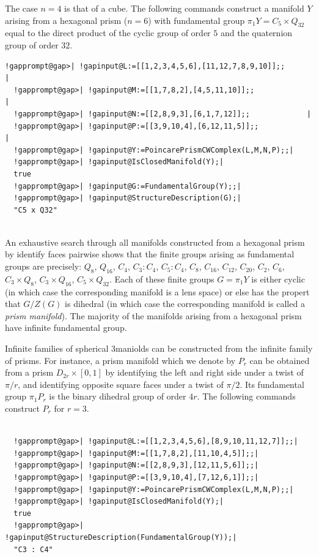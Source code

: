 \documentclass[a4paper,11pt]{report}
\begin{document}
{{  

The case $n=4$ is that of a cube. The following commands construct a manifold $Y$ arising from a hexagonal prism ($n=6$) with fundamental group $\pi_1Y=C_5\times Q_{32}$ equal to the direct product of the cyclic group of order $5$ and the quaternion group of order $32$. 
\begin{Verbatim}[commandchars=!@|,fontsize=\small,frame=single,label=Example]
  !gapprompt@gap>| !gapinput@L:=[[1,2,3,4,5,6],[11,12,7,8,9,10]];;                 |
  !gapprompt@gap>| !gapinput@M:=[[1,7,8,2],[4,5,11,10]];;             |
  !gapprompt@gap>| !gapinput@N:=[[2,8,9,3],[6,1,7,12]];;             |
  !gapprompt@gap>| !gapinput@P:=[[3,9,10,4],[6,12,11,5]];;             |
  !gapprompt@gap>| !gapinput@Y:=PoincarePrismCWComplex(L,M,N,P);;|
  !gapprompt@gap>| !gapinput@IsClosedManifold(Y);|
  true
  !gapprompt@gap>| !gapinput@G:=FundamentalGroup(Y);;|
  !gapprompt@gap>| !gapinput@StructureDescription(G);|
  "C5 x Q32"
  
\end{Verbatim}
 

An exhaustive search through all manifolds constructed from a hexagonal prism
by identify faces pairwise shows that the finite groups arising as fundamental
groups are precisely: $ Q_8$, $Q_{16}$, $C_4$, $ C_3 : C_4$, $ C_5 : C_4$, $ C_8$, $C_{16}$, $C_{12}$, $C_{20}$, $C_2$, $ C_6$, $ C_3 \times Q_8$, $ C_3 \times Q_{16}$, $C_5 \times Q_{32} $. Each of these finite groups $G=\pi_1Y$ is either cyclic (in which case the corresponding manifold is a lens space) or
else has the propert that $G/Z(G)$ is dihedral (in which case the corresponding manifold is called a \emph{prism manifold}). The majority of the manifolds arising from a hexagonal prism have infinite
fundamental group. 

 Infinite families of spherical $3$\texttt{}maniolds can be constructed from the infinite family of
prisms. For instance, a prism manifold which we denote by $P_r$ can be obtained from a prism $D_{2r}\times [0,1]$ by identifying the left and right side under a twist of $\pi/r$, and identifying opposite square faces under a twist of $\pi/2$. Its fundamental group $\pi_1P_r$ is the binary dihedral group of order $4r$. The following commands construct $P_r$ for $r=3$. 
\begin{Verbatim}[commandchars=!@|,fontsize=\small,frame=single,label=Example]
  
  !gapprompt@gap>| !gapinput@L:=[[1,2,3,4,5,6],[8,9,10,11,12,7]];;|
  !gapprompt@gap>| !gapinput@M:=[[1,7,8,2],[11,10,4,5]];;|
  !gapprompt@gap>| !gapinput@N:=[[2,8,9,3],[12,11,5,6]];;|
  !gapprompt@gap>| !gapinput@P:=[[3,9,10,4],[7,12,6,1]];;|
  !gapprompt@gap>| !gapinput@Y:=PoincarePrismCWComplex(L,M,N,P);;|
  !gapprompt@gap>| !gapinput@IsClosedManifold(Y);|
  true
  !gapprompt@gap>| !gapinput@StructureDescription(FundamentalGroup(Y));|
  "C3 : C4"
  

\end{Verbatim}}}
\end{document}
